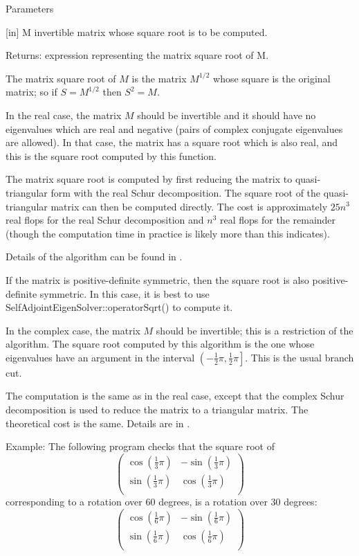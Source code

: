 Parameters

[in] M invertible matrix whose square root is to be computed.  

Returns: expression representing the matrix square root of M.

The matrix square root of $M$ is the matrix $M^{1/2}$ whose square is the original matrix; so if $S = M^{1/2}$ then $S^2=M$.

In the real case, the matrix $M$ should be invertible and it should have no eigenvalues which are real and negative (pairs of complex conjugate eigenvalues are allowed). In that case, the matrix has a square root which is also real, and this is the square root computed by this function.

The matrix square root is computed by first reducing the matrix to quasi-triangular form with the real Schur decomposition. The square root of the quasi-triangular matrix can then be computed directly. The cost is approximately $25n^3$ real flops for the real Schur decomposition and $n^3$ real flops for the remainder (though the computation time in practice is likely more than this indicates).

Details of the algorithm can be found in \cite{Higham_1987}.

If the matrix is positive-definite symmetric, then the square root is also positive-definite symmetric. In this case, it is best to use SelfAdjointEigenSolver::operatorSqrt() to compute it.


In the complex case, the matrix $M$ should be invertible; this is a restriction of the algorithm. The square root computed by this algorithm is the one whose eigenvalues have an argument in the interval $\left(-\tfrac{1}{2}\pi, \tfrac{1}{2}\pi\right]$. This is the usual branch cut.

The computation is the same as in the real case, except that the complex Schur decomposition is used to reduce the matrix to a triangular matrix. The theoretical cost is the same. Details are in \cite{Bjoerck_1983}.


Example: The following program checks that the square root of 
\begin{equation} 
\begin{pmatrix}
\cos\left(\frac{1}{3}\pi\right) & -\sin\left(\frac{1}{3}\pi\right) \\
\sin\left(\frac{1}{3}\pi\right) & \cos\left(\frac{1}{3}\pi\right) \\
\end{pmatrix}
\end{equation} 
corresponding to a rotation over 60 degrees, is a rotation over 30 degrees: 
\begin{equation} 
\begin{pmatrix}
\cos\left(\frac{1}{6}\pi\right) & -\sin\left(\frac{1}{6}\pi\right) \\
\sin\left(\frac{1}{6}\pi\right) & \cos\left(\frac{1}{6}\pi\right) \\
\end{pmatrix}
\end{equation} 




